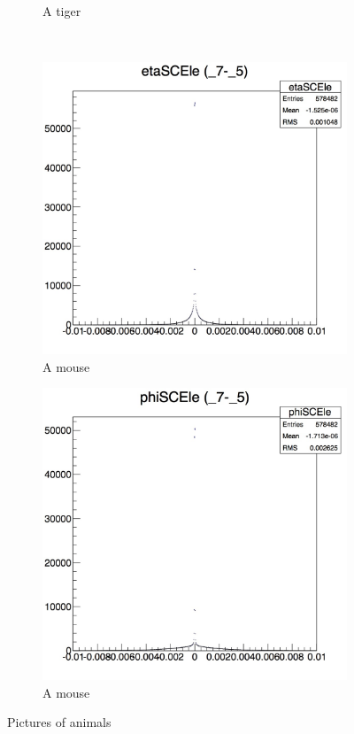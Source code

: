 \documentclass[10pt]{article}
\begin{document}
\begin{figure}[h!]
\begin{subfigure}[b]{0.22\textwidth}
                \caption{A tiger}
                \label{fig:tiger}
        \end{subfigure}
        ~ %
        \begin{subfigure}[b]{0.22\textwidth}
                \includegraphics[width=\textwidth]{Plots/etaSC}
                \caption{A mouse}
                \label{fig:mouse}
        \end{subfigure}
         \begin{subfigure}[b]{0.22\textwidth}
                \includegraphics[width=\textwidth]{Plots/phiSC}
                \caption{A mouse}
                \label{fig:mouse}
        \end{subfigure}
        \caption{Pictures of animals}\label{fig:animals}
\end{figure}
\end{document}
